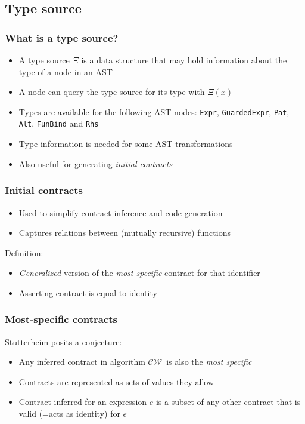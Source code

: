 \documentclass[]{beamer}
\newcommand{\CW}{$\mathcal{CW}$}
\begin{document}
\subsection{Type source}

\begin{frame}
\frametitle{What is a type source?}

\begin{itemize}
	\item A type source $\Xi$ is a data structure that may hold information about the type of a node in an AST
	\item A node can query the type source for its type with $\Xi( x )$
	\item Types are available for the following AST nodes: \texttt{Expr}, \texttt{GuardedExpr}, \texttt{Pat}, \texttt{Alt}, \texttt{FunBind} and \texttt{Rhs} 
	\item Type information is needed for some AST transformations
	\item Also useful for generating \emph{initial contracts}
\end{itemize}

\end{frame}

\begin{frame}
\frametitle{Initial contracts}

\begin{itemize}
	\item Used to simplify contract inference and code generation
	\item Captures relations between (mutually recursive) functions
\end{itemize}

Definition:
\begin{itemize}
	\item \emph{Generalized} version of the \emph{most specific} contract for that identifier
	\item Asserting contract is equal to identity
\end{itemize}

\end{frame}

\begin{frame}
\frametitle{Most-specific contracts}

Stutterheim posits a conjecture:

\begin{itemize}
	\item Any inferred contract in algorithm \CW ~is also the \emph{most specific}
	\item Contracts are represented as sets of values they allow
	\item Contract inferred for an expression $e$ is a subset of any other contract that is valid (=acts as identity) for $e$
\end{itemize}

\end{frame}
\end{document}
